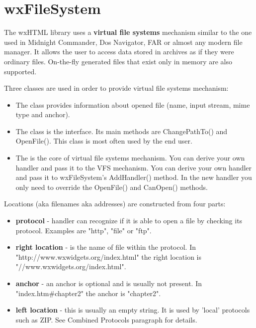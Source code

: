 \section{wxFileSystem}\label{fs}

The wxHTML library uses a {\bf virtual file systems} mechanism
similar to the one used in Midnight Commander, Dos Navigator,
FAR or almost any modern file manager. It allows the user to access
data stored in archives as if they were ordinary files. On-the-fly
generated files that exist only in memory are also supported.


Three classes are used in order to provide virtual file systems mechanism:

\begin{itemize}\itemsep=0pt
\item The  class provides information
about opened file (name, input stream, mime type and anchor).
\item The  class is the interface.
Its main methods are ChangePathTo() and OpenFile(). This class
is most often used by the end user.
\item The  is the core
of virtual file systems mechanism. You can derive your own handler and pass it to
the VFS mechanism. You can derive your own handler and pass it to
wxFileSystem's AddHandler() method. In the new handler you only need to
override the OpenFile() and CanOpen() methods.
\end{itemize}


Locations (aka filenames aka addresses) are constructed from four parts:

\begin{itemize}\itemsep=0pt
\item {\bf protocol} - handler can recognize if it is able to open a
file by checking its protocol. Examples are "http", "file" or "ftp".
\item {\bf right location} - is the name of file within the protocol.
In "http://www.wxwidgets.org/index.html" the right location is "//www.wxwidgets.org/index.html".
\item {\bf anchor} - an anchor is optional and is usually not present.
In "index.htm\#chapter2" the anchor is "chapter2".
\item {\bf left location} - this is usually an empty string. 
It is used by 'local' protocols such as ZIP.
See Combined Protocols paragraph for details.
\end{itemize}

